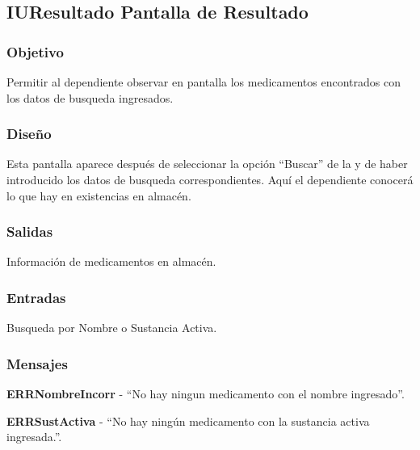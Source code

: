 \subsection{IUResultado Pantalla de Resultado}

\subsubsection{Objetivo}
	Permitir al dependiente observar en pantalla los medicamentos encontrados con los datos de busqueda ingresados.

\subsubsection{Diseño}
	Esta pantalla aparece despu\'es de seleccionar la opci\'on "`Buscar"' de la \label{IUConsulta} y de haber introducido los datos de busqueda correspondientes. Aqu\'i el dependiente conocer\'a lo que hay en existencias en almac\'en.


\subsubsection{Salidas}

	Informaci\'on de medicamentos en almac\'en.

\subsubsection{Entradas}
Busqueda por Nombre o Sustancia Activa.

\subsubsection{Mensajes}
	\begin{Citemize}
		\item {\bf ERRNombreIncorr} - "`No hay ningun medicamento con el nombre ingresado"'.
		\item {\bf ERRSustActiva} - "`No hay ning\'un medicamento con la sustancia activa ingresada."'.
	\end{Citemize}